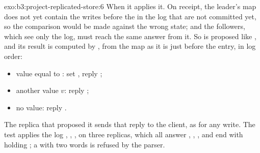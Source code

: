 \begin{solution}{exo:b3:project-replicated-store:6}
When it applies it. On receipt, the leader's map does not yet contain the writes before the  in the log that are not committed yet, so the comparison would be made against the wrong state; and the followers, which see only the log, must reach the same answer from it. So  is proposed like , and its result is computed by , from the map as it is just before the entry, in log order:
\begin{itemize}
\item value equal to : set , reply ;
\item another value $v$: reply ;
\item no value: reply .
\end{itemize}
The replica that proposed it sends that reply to the client, as for any write. The test  applies the log , , ,  on three replicas, which all answer , , ,  and end with  holding ; a  with two words is refused by the parser.
\end{solution}

